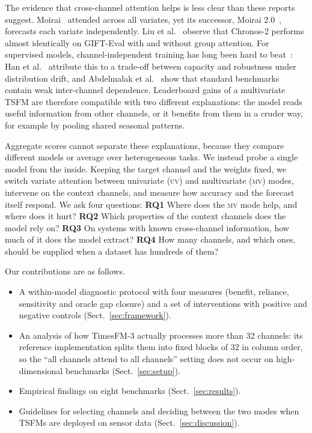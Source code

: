 \documentclass[runningheads]{llncs}
\newif\ifshowtodos
\newcommand{\todo}[1]{\ifshowtodos\textcolor{red}{[TODO: #1]}\fi}
\newcommand{\MV}{\textsc{mv}}
\newcommand{\UV}{\textsc{uv}}
\newcommand{\tfm}{TimesFM-3}
\begin{document}
The evidence that cross-channel attention helps is less clear than these
reports suggest. Moirai~\cite{woo2024moirai} attended across all variates,
yet its successor, Moirai 2.0~\cite{liu2025moirai2}, forecasts
each variate independently. Liu et al.~\cite{liu2026falconx} observe that Chronos-2
performs almost identically on GIFT-Eval with and without group attention.
For supervised models, channel-independent training has long been hard to
beat~\cite{nie2023patchtst,zeng2023dlinear}: Han et
al.~\cite{han2024capacity} attribute this to a trade-off between capacity
and robustness under distribution drift, and Abdelmalak et
al.~\cite{abdelmalak2025lookback} show that standard benchmarks contain weak
inter-channel dependence. Leaderboard gains of a multivariate TSFM are
therefore compatible with two different explanations: the model reads useful
information from other channels, or it benefits from them in a cruder way,
for example by pooling shared seasonal patterns.

Aggregate scores cannot separate these explanations, because they compare
different models or average over heterogeneous tasks. We instead probe a
single model from the inside. Keeping the target channel and the weights
fixed, we switch variate attention between univariate (\UV) and multivariate
(\MV) modes, intervene on the context channels, and measure how accuracy and
the forecast itself respond. We ask four questions:
\textbf{RQ1} Where does the \MV{} mode help, and where does it hurt?
\textbf{RQ2} Which properties of the context channels does the model rely on?
\textbf{RQ3} On systems with known cross-channel information, how much of it
does the model extract?
\textbf{RQ4} How many channels, and which ones, should be supplied when a
dataset has hundreds of them?

Our contributions are as follows.
\begin{itemize}
  \item A within-model diagnostic protocol with four measures (benefit,
        reliance, sensitivity and oracle gap closure) and a set of
        interventions with positive and negative controls
        (Sect.~\ref{sec:framework}).
  \item An analysis of how \tfm{} actually processes more than 32 channels:
        its reference implementation splits them into fixed blocks of 32 in
        column order, so the ``all channels attend to all channels'' setting
        does not occur on high-dimensional benchmarks
        (Sect.~\ref{sec:setup}).
  \item Empirical findings on eight benchmarks \todo{and synthetic systems,
        and a comparison with Chronos-2 and supervised baselines}
        (Sect.~\ref{sec:results}).
  \item Guidelines for selecting channels and deciding between the two modes
        when TSFMs are deployed on sensor data (Sect.~\ref{sec:discussion}).
\end{itemize}
\end{document}
